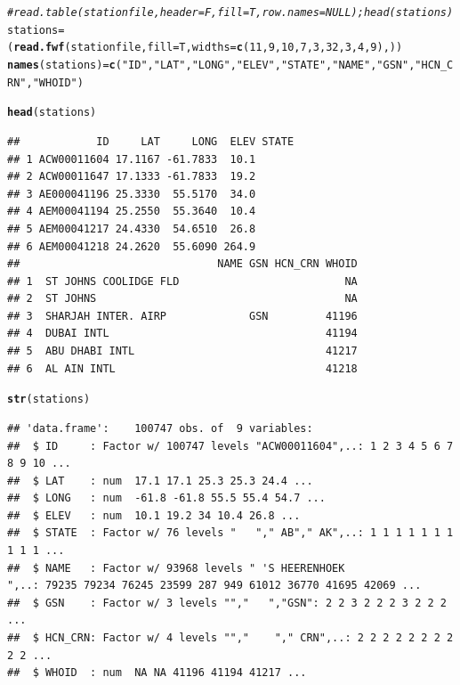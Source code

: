 \documentclass{article}\usepackage[]{graphicx}\usepackage[]{color}
\makeatletter
\newcommand{\hlnum}[1]{\textcolor[rgb]{0.686,0.059,0.569}{#1}}%
\newcommand{\hlstr}[1]{\textcolor[rgb]{0.192,0.494,0.8}{#1}}%
\newcommand{\hlcom}[1]{\textcolor[rgb]{0.678,0.584,0.686}{\textit{#1}}}%
\newcommand{\hlstd}[1]{\textcolor[rgb]{0.345,0.345,0.345}{#1}}%
\newcommand{\hlkwb}[1]{\textcolor[rgb]{0.69,0.353,0.396}{#1}}%
\newcommand{\hlkwc}[1]{\textcolor[rgb]{0.333,0.667,0.333}{#1}}%
\newcommand{\hlkwd}[1]{\textcolor[rgb]{0.737,0.353,0.396}{\textbf{#1}}}%
\newenvironment{kframe}{%
 \def\at@end@of@kframe{}%
 \ifinner\ifhmode%
  \def\at@end@of@kframe{\end{minipage}}%
  \begin{minipage}{\columnwidth}%
 \fi\fi%
 \def\FrameCommand##1{\hskip\@totalleftmargin \hskip-\fboxsep
 \colorbox{shadecolor}{##1}\hskip-\fboxsep
     \hskip-\linewidth \hskip-\@totalleftmargin \hskip\columnwidth}%
 \MakeFramed {\advance\hsize-\width
   \@totalleftmargin\z@ \linewidth\hsize
   \@setminipage}}%
 {\par\unskip\endMakeFramed%
 \at@end@of@kframe}
\newenvironment{knitrout}{}{} %
\makeatother
\begin{document}
\begin{knitrout}
\color{fgcolor}\begin{kframe}
\begin{alltt}
\hlcom{# read.table(stationfile, header=F, fill=T, row.names=NULL); head(stations)}
\hlstd{stations} \hlkwb{=} \hlstd{(}\hlkwd{read.fwf}\hlstd{(stationfile,} \hlkwc{fill}\hlstd{=T,} \hlkwc{widths}\hlstd{=} \hlkwd{c}\hlstd{(}\hlnum{11}\hlstd{,} \hlnum{9}\hlstd{,} \hlnum{10}\hlstd{,} \hlnum{7}\hlstd{,} \hlnum{3}\hlstd{,} \hlnum{32}\hlstd{,} \hlnum{3}\hlstd{,} \hlnum{4}\hlstd{,} \hlnum{9}\hlstd{), ))}
\hlkwd{names}\hlstd{(stations)}\hlkwb{=} \hlkwd{c}\hlstd{(}\hlstr{"ID"}\hlstd{,} \hlstr{"LAT"}\hlstd{,} \hlstr{"LONG"}\hlstd{,} \hlstr{"ELEV"}\hlstd{,} \hlstr{"STATE"}\hlstd{,} \hlstr{"NAME"}\hlstd{,} \hlstr{"GSN"}\hlstd{,} \hlstr{"HCN_CRN"}\hlstd{,} \hlstr{"WHOID"}\hlstd{)}

\hlkwd{head}\hlstd{(stations)}
\end{alltt}
\begin{verbatim}
##            ID     LAT     LONG  ELEV STATE
## 1 ACW00011604 17.1167 -61.7833  10.1      
## 2 ACW00011647 17.1333 -61.7833  19.2      
## 3 AE000041196 25.3330  55.5170  34.0      
## 4 AEM00041194 25.2550  55.3640  10.4      
## 5 AEM00041217 24.4330  54.6510  26.8      
## 6 AEM00041218 24.2620  55.6090 264.9      
##                               NAME GSN HCN_CRN WHOID
## 1  ST JOHNS COOLIDGE FLD                          NA
## 2  ST JOHNS                                       NA
## 3  SHARJAH INTER. AIRP             GSN         41196
## 4  DUBAI INTL                                  41194
## 5  ABU DHABI INTL                              41217
## 6  AL AIN INTL                                 41218
\end{verbatim}
\begin{alltt}
\hlkwd{str}\hlstd{(stations)}
\end{alltt}
\begin{verbatim}
## 'data.frame':	100747 obs. of  9 variables:
##  $ ID     : Factor w/ 100747 levels "ACW00011604",..: 1 2 3 4 5 6 7 8 9 10 ...
##  $ LAT    : num  17.1 17.1 25.3 25.3 24.4 ...
##  $ LONG   : num  -61.8 -61.8 55.5 55.4 54.7 ...
##  $ ELEV   : num  10.1 19.2 34 10.4 26.8 ...
##  $ STATE  : Factor w/ 76 levels "   "," AB"," AK",..: 1 1 1 1 1 1 1 1 1 1 ...
##  $ NAME   : Factor w/ 93968 levels " 'S HEERENHOEK                  ",..: 79235 79234 76245 23599 287 949 61012 36770 41695 42069 ...
##  $ GSN    : Factor w/ 3 levels "","   ","GSN": 2 2 3 2 2 2 3 2 2 2 ...
##  $ HCN_CRN: Factor w/ 4 levels "","    "," CRN",..: 2 2 2 2 2 2 2 2 2 2 ...
##  $ WHOID  : num  NA NA 41196 41194 41217 ...
\end{verbatim}
\end{kframe}
\end{knitrout}
\end{document}

